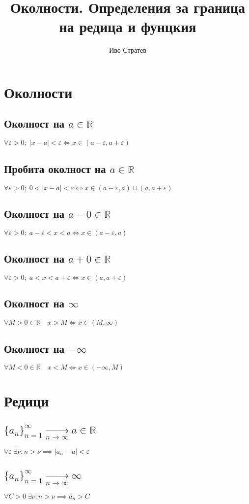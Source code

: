 \documentclass{article}
\title{Околности. Определения за граница на редица и фунцкия}
\author{Иво Стратев}
\newcommand{\pto}[2]{\xrightarrow[#1 \to #2]{}}
\newcommand{\nto}[0]{\pto{n}{\infty}}
\newcommand{\R}[0]{\mathbb{R}}
\newcommand{\spc}[0]{\quad}
\newcommand{\e}[0]{\varepsilon}
\newcommand{\seq}[1]{\{#1_n\}_{n=1}^{\infty}}
\begin{document}
    \maketitle
    \section{Околности}
    \subsection{Околност на \(a \in \R\)}
    \(\forall \e > 0; \; |x - a| < \e \iff x \in (a - \e, a + \e)\)
    \subsection{Пробита околност на \(a \in \R\)}
    \(\forall \e > 0; \; 0 < |x - a| < \e \iff x \in (a - \e, a) \cup (a, a + \e)\)
    \subsection{Околност на \(a - 0 \in \R\)}
    \(\forall \e > 0; \; a - \e < x < a \iff x \in (a - \e, a)\)
    \subsection{Околност на \(a + 0 \in \R\)}
    \(\forall \e > 0; \; a < x < a + \e \iff x \in (a, a + \e)\)
    \subsection{Околност на \(\infty\)}
    \(\forall M > 0 \in \R \spc x > M \iff x \in (M, \infty)\)
    \subsection{Околност на \(-\infty\)}
    \(\forall M < 0 \in \R \spc x < M \iff x \in (-\infty, M)\)
    \section{Редици}
    \subsection{\(\seq{a} \nto a \in \R\)}
    \(\forall \e \; \exists \nu; n > \nu \implies |a_n - a| < \e\)
    \subsection{\(\seq{a} \nto \infty\)}
    \(\forall C > 0 \; \exists \nu; n > \nu \implies a_n > C\)
\end{document}
